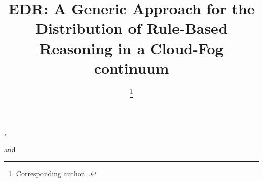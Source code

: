 \documentclass[sw]{iosart2x}
\begin{document}
\begin{frontmatter}                           
	
\title{EDR: A Generic Approach for the Distribution of Rule-Based Reasoning in a Cloud-Fog continuum}




\author[A,B]{ },
\author[B]{ }
\author[A]{ 
\thanks{Corresponding author. .}}
and
\author[B]{ }
\address[A]{MELODI, , Toulouse,  \\email: \{name.surname\}@irit.fr}
\address[B]{SARA, , Toulouse, \\email: \{name.surname\}@laas.fr}




\end{frontmatter}
\end{document}
